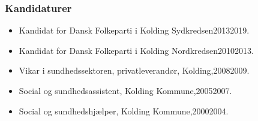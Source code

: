 \documentclass[11pt, a4paper]{awesome-cv}
\begin{document}
\begin{cvletter}
\subsubsection*{Kandidaturer}
\begin{itemize}
\item Kandidat for Dansk Folkeparti i Kolding Sydkredsen20132019.
\item Kandidat for Dansk Folkeparti i Kolding Nordkredsen20102013.
\end{itemize}
\begin{itemize}
\item Vikar i sundhedssektoren, privatleverandør, Kolding,20082009.
\item Social og sundhedsassistent, Kolding Kommune,20052007.
\item Social og sundhedshjælper, Kolding Kommune,20002004.
\end{itemize}
\end{cvletter}
\end{document}

